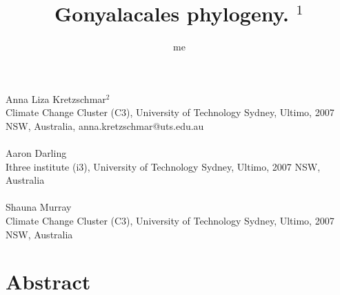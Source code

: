\documentclass[12pt]{article}
\title{Gonyalacales phylogeny. $^{1}$}
\author{me}
\date{}
\begin{document}
\maketitle
\paragraph{}Anna Liza Kretzschmar$^{2}$\\
Climate Change Cluster (C3), University of Technology Sydney, Ultimo, 2007 NSW, Australia, anna.kretzschmar@uts.edu.au
\paragraph{}Aaron Darling \\
Ithree institute (i3), University of Technology Sydney, Ultimo, 2007 NSW, Australia
\paragraph{}Shauna Murray\\ 
Climate Change Cluster (C3), University of Technology Sydney, Ultimo, 2007 NSW, Australia
\newpage
\section{Abstract}
\newpage
\end{document}
